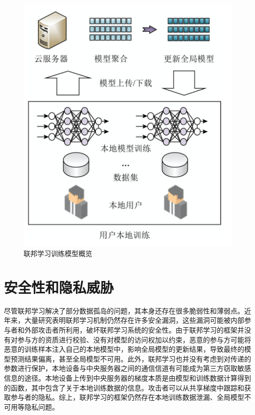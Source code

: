 \begin{figure}[!hbt]
\centering
	\includegraphics[scale=0.5]{fig2/C1/联邦学习训练模式}%
	\caption{联邦学习训练模型概览}
	\label{fig:联邦学习模型概况}	
\end{figure}

\section{安全性和隐私威胁}
尽管联邦学习解决了部分数据孤岛的问题，其本身还存在很多脆弱性和薄弱点。近年来，大量研究表明联邦学习机制仍然存在许多安全漏洞，这些漏洞可能被内部参与者和外部攻击者所利用，破坏联邦学习系统的安全性。由于联邦学习的框架并没有对参与方的资质进行校验、没有对模型的访问权加以约束，恶意的参与方可能将恶意的训练样本注入自己的本地模型中，影响全局模型的更新结果，导致最终的模型预测结果偏离，甚至全局模型不可用。此外，联邦学习也并没有考虑到对传递的参数进行保护，本地设备与中央服务器之间的通信信道有可能成为第三方窃取敏感信息的途径。本地设备上传到中央服务器的梯度本质是由模型和训练数据计算得到的函数，其中包含了关于本地训练数据的信息。攻击者可以从共享梯度中跟踪和获取参与者的隐私。综上，联邦学习的框架仍然存在本地训练数据泄漏、全局模型不可用等隐私问题。

